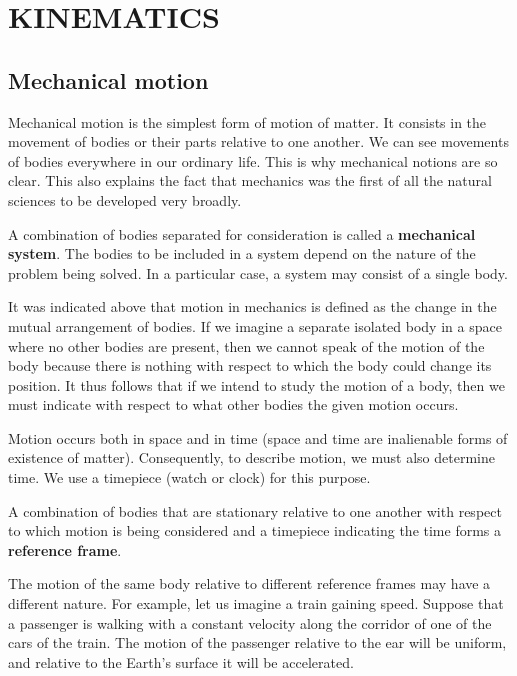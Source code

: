 

\chapter{KINEMATICS}\label{chap:1}

\section{Mechanical motion}\label{sec:1_1}

Mechanical motion is the simplest form of motion of matter. It consists in the movement of bodies or their parts relative to one another. We can see movements of bodies everywhere in our ordinary life. This is why mechanical notions are so clear. This also explains the fact that mechanics was the first of all the natural sciences to be developed very broadly.

A combination of bodies separated for consideration is called a \textbf{mechanical system}. The bodies to be included in a system depend on the nature of the problem being solved. In a particular case, a system may consist of a single body.

It was indicated above that motion in mechanics is defined as the change in the mutual arrangement of bodies. If we imagine a separate isolated body in a space where no other bodies are present, then we cannot speak of the motion of the body because there is nothing with respect to which the body could change its position. It thus follows that if we intend to study the motion of a body, then we must indicate with respect to what other bodies the given motion occurs.

Motion occurs both in space and in time (space and time are inalienable forms of existence of matter). Consequently, to describe motion, we must also determine time. We use a timepiece (watch or clock) for this purpose.

A combination of bodies that are stationary relative to one another with respect to which motion is being considered and a timepiece indicating the time forms a \textbf{reference frame}.

The motion of the same body relative to different reference frames may have a different nature. For example, let us imagine a train gaining speed. Suppose that a passenger is walking with a constant velocity along the corridor of one of the cars of the train. The motion of the passenger relative to the ear will be uniform, and relative to the Earth's surface it will be accelerated.

